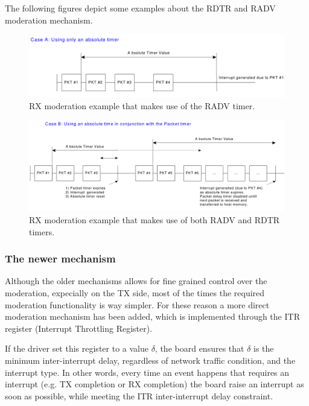 The following figures depict some examples about the RDTR and RADV moderation mechanism.

\begin{figure}[bt]
\centering
\includegraphics[scale = 0.45]{radv-only.png}
\caption{RX moderation example that makes use of the RADV timer.}
\label{fig:rdtrstate}
\end{figure}

\begin{figure}[bt]
\centering
\includegraphics[scale = 0.45]{rdtr-radv.png}
\caption{RX moderation example that makes use of both RADV and RDTR timers.}
\label{fig:rdtrstate}
\end{figure}


\subsubsection{The newer mechanism}
Although the older mechanisms allows for fine grained control over the moderation, expecially on the TX side, most of the times the 
required moderation functionality is way simpler. For these reason a more direct moderation mechanism has been added, which is implemented
through the ITR register (Interrupt Throttling Register).

If the driver set this register to a value $\delta$, the board ensures that $\delta$ is the minimum inter-interrupt delay, regardless of
network traffic condition, and the interrupt type.
In other words, every time an event happens that requires an interrupt (e.g. TX completion or RX completion) the board raise an interrupt
as soon as possible, while meeting the ITR inter-interrupt delay constraint.

\vspace{0.5cm}

